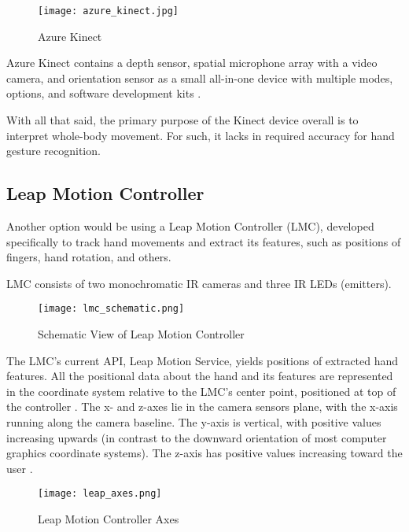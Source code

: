 \begin{figure}[ht]
	\centering
    \texttt{[image: azure\_kinect.jpg]}
	\caption{Azure Kinect \cite{azurekinect_pic}}
	\label{fig:azureKincet}
\end{figure}

Azure Kinect contains a depth sensor, spatial microphone array with a video camera, and orientation sensor as a small all-in-one device with multiple modes, options, and software development kits \cite{azurekinect}.

With all that said, the primary purpose of the Kinect device overall is to interpret whole-body movement. For such, it lacks in required accuracy for hand gesture recognition. 

\subsection{Leap Motion Controller}

Another option would be using a Leap Motion Controller (LMC), developed specifically to track hand movements and extract its features, such as positions of fingers, hand rotation, and others.

LMC consists of two monochromatic IR cameras and three IR LEDs (emitters). 

\begin{figure}[ht]
	\centering
    \texttt{[image: lmc\_schematic.png]}
	\caption{Schematic View of Leap Motion Controller \cite{LMCanalysis}}
	\label{fig:lmcScheme}
\end{figure}



The LMC's current API, Leap Motion Service, yields positions of extracted hand features. All the positional data about the hand and its features are represented in the coordinate system relative to the LMC's center point, positioned at top of the controller \cite{LMCanalysis}. The x- and z-axes lie in the camera sensors plane, with the x-axis running along the camera baseline. The y-axis is vertical, with positive values increasing upwards (in contrast to the downward orientation of most computer graphics coordinate systems). The z-axis has positive values increasing toward the user \cite{tomasMultileap}.

\begin{figure}[ht]
	\centering
    \texttt{[image: leap\_axes.png]}
	\caption{Leap Motion Controller Axes \cite{tomasMultileap}}
	\label{fig:lmcScheme}
\end{figure}

